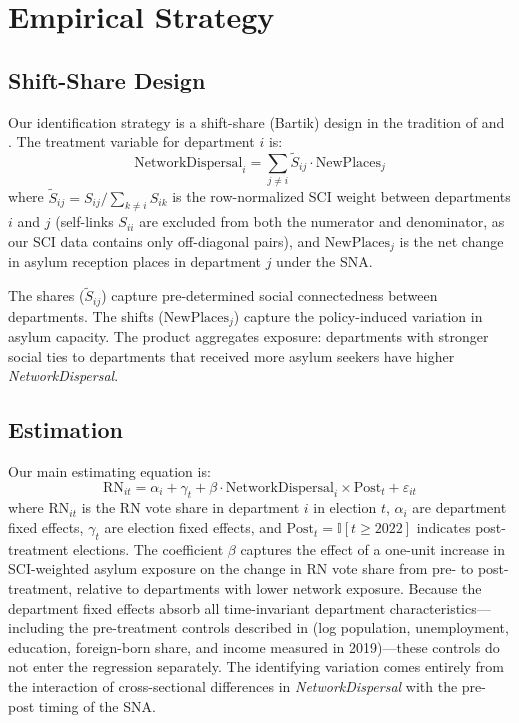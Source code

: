 \documentclass[12pt]{article}
\newcommand{\ind}{\mathbb{I}}
\begin{document}
\section{Empirical Strategy}
\label{sec:strategy}

\subsection{Shift-Share Design}

Our identification strategy is a shift-share (Bartik) design in the tradition of \citet{borusyak2022quasi} and \citet{goldsmith2020bartik}. The treatment variable for department $i$ is:
\begin{equation}
\text{NetworkDispersal}_i = \sum_{j \neq i} \tilde{S}_{ij} \cdot \text{NewPlaces}_j
\label{eq:bartik}
\end{equation}
where $\tilde{S}_{ij} = S_{ij} / \sum_{k \neq i} S_{ik}$ is the row-normalized SCI weight between departments $i$ and $j$ (self-links $S_{ii}$ are excluded from both the numerator and denominator, as our SCI data contains only off-diagonal pairs), and $\text{NewPlaces}_j$ is the net change in asylum reception places in department $j$ under the SNA.

The shares ($\tilde{S}_{ij}$) capture pre-determined social connectedness between departments. The shifts ($\text{NewPlaces}_j$) capture the policy-induced variation in asylum capacity. The product aggregates exposure: departments with stronger social ties to departments that received more asylum seekers have higher \textit{NetworkDispersal}.

\subsection{Estimation}

Our main estimating equation is:
\begin{equation}
\text{RN}_{it} = \alpha_i + \gamma_t + \beta \cdot \text{NetworkDispersal}_i \times \text{Post}_t + \varepsilon_{it}
\label{eq:main}
\end{equation}
where $\text{RN}_{it}$ is the RN vote share in department $i$ in election $t$, $\alpha_i$ are department fixed effects, $\gamma_t$ are election fixed effects, and $\text{Post}_t = \ind[t \geq 2022]$ indicates post-treatment elections. The coefficient $\beta$ captures the effect of a one-unit increase in SCI-weighted asylum exposure on the change in RN vote share from pre- to post-treatment, relative to departments with lower network exposure. Because the department fixed effects absorb all time-invariant department characteristics---including the pre-treatment controls described in  (log population, unemployment, education, foreign-born share, and income measured in 2019)---these controls do not enter the regression separately. The identifying variation comes entirely from the interaction of cross-sectional differences in \textit{NetworkDispersal} with the pre-post timing of the SNA.
\end{document}
